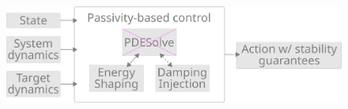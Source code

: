 \documentclass[
]{report}
\begin{document}
\begin{figure}

\begin{minipage}[c]{0.61\linewidth}

{\centering 

\includegraphics{contents/assets/pbc-outline-cross.svg}

}

\end{minipage}%
%
\begin{minipage}[c]{0.03\linewidth}

{\centering 

~

}

\end{minipage}%
%
\begin{minipage}[c]{0.36\linewidth}

{\centering 

~

}

\end{minipage}%

\end{figure}
\end{document}
